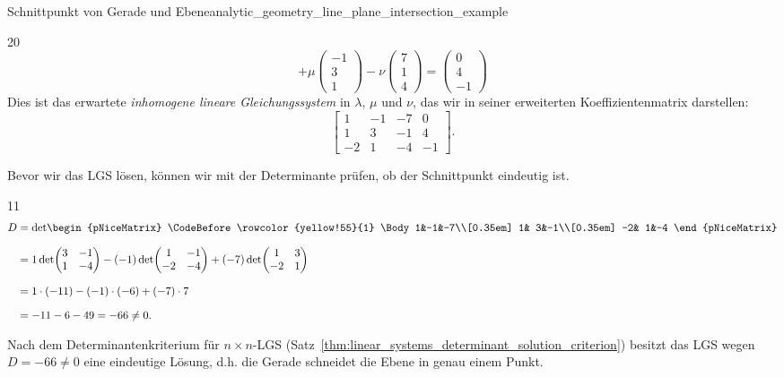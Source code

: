 \begin{ExampleBox}{Schnittpunkt von Gerade und Ebene}{analytic_geometry_line_plane_intersection_example}
\begin{ClozeArea}[34]{20}
\[      +\mu\begin{pmatrix}-1\\3\\1\end{pmatrix}
      -\nu\begin{pmatrix}7\\1\\4\end{pmatrix}
      =\begin{pmatrix}0\\4\\-1\end{pmatrix}
    \]
    Dies ist das erwartete \emph{inhomogene lineare Gleichungssystem} in $\lambda$,
    $\mu$ und $\nu$, das wir in seiner erweiterten Koeffizientenmatrix darstellen:
    \[
      \left[
        \begin{array}{rrr|r}
          1&-1&-7&0\\
          1& 3&-1&4\\
         -2& 1&-4&-1
        \end{array}
      \right].
    \]
  \end{ClozeArea}
  Bevor wir das LGS lösen, können wir mit der Determinante prüfen, ob der
  Schnittpunkt eindeutig ist.
  \begin{ClozeArea}[34]{11}
    \[
      \begin{aligned}
        D
        &=\det\!\begin{pNiceMatrix}
            \CodeBefore
              \rowcolor{yellow!55}{1}
            \Body
            1&-1&-7\\[0.35em]
            1& 3&-1\\[0.35em]
           -2& 1&-4
          \end{pNiceMatrix}\\[0.7em]
        &=1\det\!\begin{pmatrix}3&-1\\1&-4\end{pmatrix}
          -(-1)\det\!\begin{pmatrix}1&-1\\-2&-4\end{pmatrix}
          +(-7)\det\!\begin{pmatrix}1&3\\-2&1\end{pmatrix}\\[0.7em]
        &=1\cdot(-11)-(-1)\cdot(-6)+(-7)\cdot7\\[0.7em]
        &=-11-6-49=-66\ne0.
      \end{aligned}
    \]
  \end{ClozeArea}
  Nach dem Determinantenkriterium für $n\times n$-LGS
  (Satz~\ref{thm:linear_systems_determinant_solution_criterion}) besitzt das
  LGS wegen $D=-66\ne0$ eine eindeutige Lösung, d.h. die Gerade schneidet die
  Ebene in genau einem Punkt.
\end{ExampleBox}

